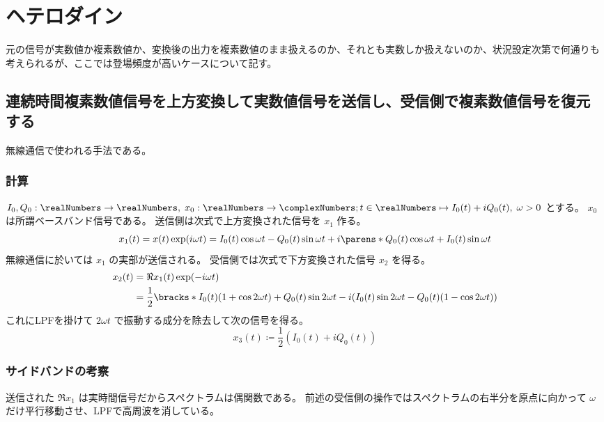 \chapter{ヘテロダイン}
    元の信号が実数値か複素数値か、変換後の出力を複素数値のまま扱えるのか、それとも実数しか扱えないのか、状況設定次第で何通りも考えられるが、ここでは登場頻度が高いケースについて記す。
    \section{連続時間複素数値信号を上方変換して実数値信号を送信し、受信側で複素数値信号を復元する}
        無線通信で使われる手法である。
        \subsection{計算}
            $I_0, Q_0:\realNumbers\to\realNumbers,\;x_0:\realNumbers\to\complexNumbers; t\in\realNumbers\mapsto I_0(t) + iQ_0(t),\;\omega > 0$ とする。
            $x_0$ は所謂ベースバンド信号である。
            送信側は次式で上方変換された信号を $x_1$ 作る。
            \[ x_1(t) = x(t)\exp(i\omega t) = I_0(t)\cos\omega t - Q_0(t)\sin\omega t + i\parens*{Q_0(t)\cos\omega t + I_0(t)\sin\omega t} \]
            無線通信に於いては $x_1$ の実部が送信される。
            受信側では次式で下方変換された信号 $x_2$ を得る。
            \begin{align*}
                x_2(t) &= \Re{x_1(t)}\exp(-i\omega t) \\
                &= \frac{1}{2}\bracks*{I_0(t)(1+\cos 2\omega t) + Q_0(t)\sin 2\omega t - i(I_0(t)\sin 2\omega t - Q_0(t)(1-\cos 2\omega t))}
            \end{align*}
            これにLPFを掛けて $2\omega t$ で振動する成分を除去して次の信号を得る。
            \[ x_3(t) \coloneq \frac{1}{2}(I_0(t) + iQ_0(t)) \]
        \subsection{サイドバンドの考察}
            送信された $\Re{x_1}$ は実時間信号だからスペクトラムは偶関数である。
            前述の受信側の操作ではスペクトラムの右半分を原点に向かって $\omega$ だけ平行移動させ、LPFで高周波を消している。
